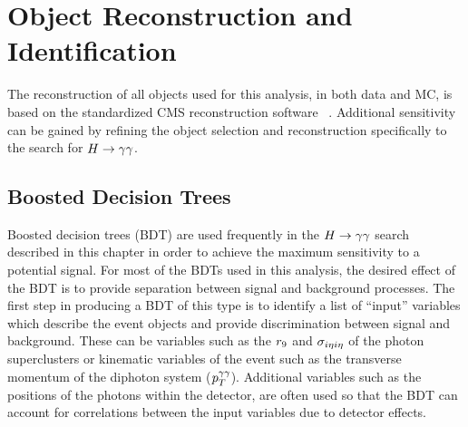 \section{Object Reconstruction and Identification}
\label{sec:objectrecoandid}

The reconstruction of all objects used for this analysis, in both data and MC,
is based on the standardized CMS reconstruction software \texttt{\cmssw}~\citep{cmssw}. 
Additional sensitivity can be gained by refining the object selection and reconstruction specifically
to the search for $H\rightarrow\gamma\gamma$.

\subsection{Boosted Decision Trees}
\label{sec:bdts}
Boosted decision trees (BDT) are used frequently in the $H\rightarrow\gamma\gamma$ search described in this
chapter in order to achieve the maximum sensitivity to a potential signal.
For most of the BDTs used in this analysis, the desired effect
of the BDT is to provide separation between signal and background processes. 
The first step in producing a BDT of this type is to identify a list of ``input'' 
variables which describe the event objects and provide discrimination 
between signal and background.  
These can be variables such as the $r_{9}$ and $\sigma_{i\eta i\eta}$ 
of the photon superclusters or kinematic variables of the event such as
the transverse momentum of the diphoton system ($p_{T}^{\gamma\gamma}$). 
Additional variables such as the positions of the photons within the detector,
are often used so that the BDT can account for correlations between the 
input variables due to detector effects.

